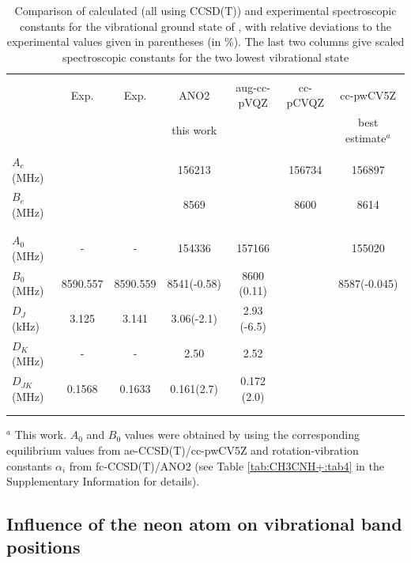 \begin{table}

\caption{Comparison of calculated (all using CCSD(T)) and experimental spectroscopic constants for the vibrational ground state of \texorpdfstring{\pan}{}, with relative deviations to the experimental values \cite{GAM2000} given in parentheses (in \texorpdfstring{$\%$}{}). The last two columns give scaled spectroscopic constants for the two lowest vibrational state}\label{tbl2}
    \centering
    \scriptsize
    \begin{tabular}{lcccccc}
    \\\hline \hline\\
          & Exp.  & Exp.  & ANO2 & aug-cc-pVQZ & cc-pCVQZ & cc-pwCV5Z  \\
         &  \cite{GAM2000}& \cite{AHH2006}& this work &  \cite{Cerqueira2020} &  \cite{Botschwina2000}& best estimate$^a$ \\
         \hline\\
         $A_e$ (MHz) &  &  & 156213 &  & 156734  & 156897 \\
         $B_e$ (MHz) &  &  & 8569 &  & 8600 & 8614  \\
        \\\hline\\
         $A_0$ (MHz) & - & - & 154336 & 157166& & 155020  \\
        $B_0$ (MHz) & 8590.557 & 8590.559& 8541(-0.58) & 8600 (0.11)& & 8587(-0.045)  \\
         $D_J$ (kHz)  & 3.125 & 3.141 & 3.06(-2.1)&  2.93 (-6.5) & &  \\
         $D_K$ (MHz)  & - & - &  2.50 & 2.52 & & \\
         $D_{JK}$ (MHz) &  0.1568 & 0.1633 & 0.161(2.7) & 0.172 (2.0) & &    \\
         \\\hline \hline\\
    \end{tabular}

$^a$ This work. $A_0$ and $B_0$ values were obtained by using the corresponding equilibrium values from ae-CCSD(T)/cc-pwCV5Z and rotation-vibration constants $\alpha_i$ from fc-CCSD(T)/ANO2 (see Table \ref{tab:CH3CNH+:tab4} in the Supplementary Information for details).

\end{table}
\normalsize


\subsection{Influence of the neon atom on vibrational band positions}
\label{Neon influence}

